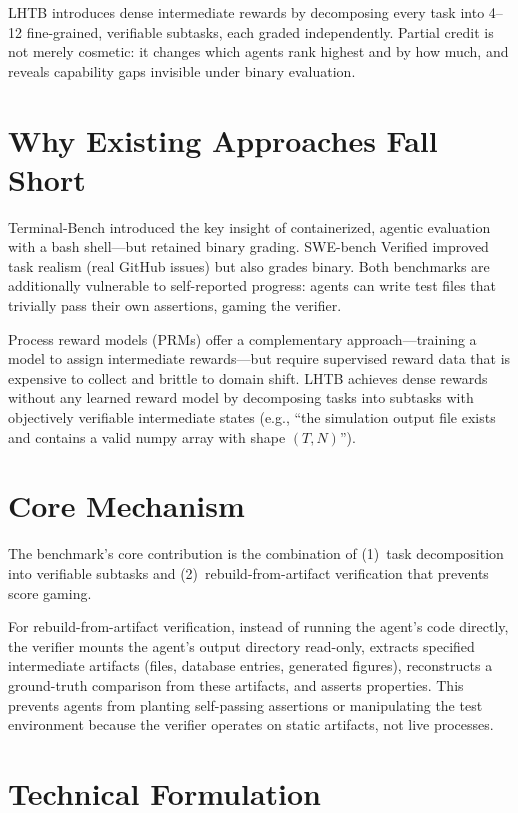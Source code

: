 \documentclass[10pt,twocolumn]{article}
\begin{document}
LHTB introduces dense intermediate rewards by decomposing every task
into 4--12 fine-grained, verifiable subtasks, each graded independently.
Partial credit is not merely cosmetic: it changes which agents rank
highest and by how much, and reveals capability gaps invisible under
binary evaluation.

\section{Why Existing Approaches Fall Short}

Terminal-Bench introduced the key insight of containerized, agentic
evaluation with a bash shell---but retained binary grading. SWE-bench
Verified improved task realism (real GitHub issues) but also grades
binary. Both benchmarks are additionally vulnerable to self-reported
progress: agents can write test files that trivially pass their own
assertions, gaming the verifier.

Process reward models (PRMs) offer a complementary approach---training
a model to assign intermediate rewards---but require supervised reward
data that is expensive to collect and brittle to domain shift. LHTB
achieves dense rewards without any learned reward model by decomposing
tasks into subtasks with objectively verifiable intermediate states
(e.g., ``the simulation output file exists and contains a valid numpy
array with shape $(T, N)$'').

\section{Core Mechanism}

The benchmark's core contribution is the combination of (1)~task
decomposition into verifiable subtasks and (2)~rebuild-from-artifact
verification that prevents score gaming.

For rebuild-from-artifact verification, instead of running the agent's
code directly, the verifier mounts the agent's output directory
read-only, extracts specified intermediate artifacts (files, database
entries, generated figures), reconstructs a ground-truth comparison
from these artifacts, and asserts properties. This prevents agents
from planting self-passing assertions or manipulating the test
environment because the verifier operates on static artifacts, not
live processes.

\section{Technical Formulation}
\end{document}
